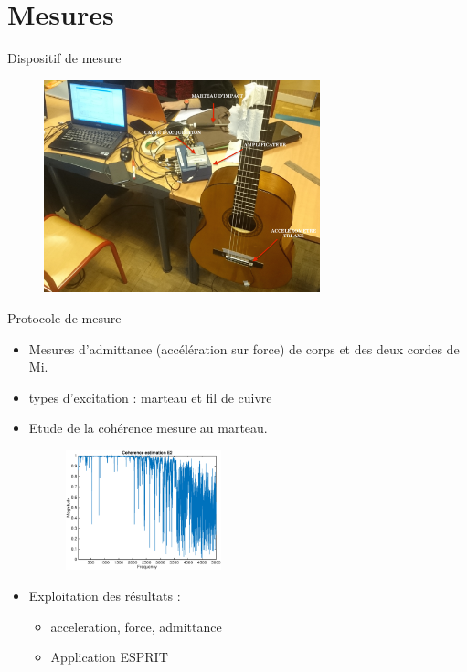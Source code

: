 \section{Mesures}

\begin{frame}{Dispositif de mesure}
\begin{figure}
\centering
\includegraphics[width = 8cm]{figures/dispo.JPG}
\end{figure}
\end{frame}

 \begin{frame}{Protocole de mesure} 
  \begin{itemize}
  	\item Mesures d'admittance (accélération sur force) de corps et des deux cordes de Mi.
  	\item types d'excitation : marteau et fil de cuivre
    \item Etude de la cohérence mesure au marteau.
    \begin{figure}
		\centering
		\includegraphics[width = 4.5cm]{figures/coherence_Z_1_E2.eps}
	\end{figure}
  
  \item Exploitation des résultats : 
  \begin{itemize}
  	\item acceleration, force, admittance
  	\item Application ESPRIT
  \end{itemize}
  \end{itemize} 
 \end{frame}